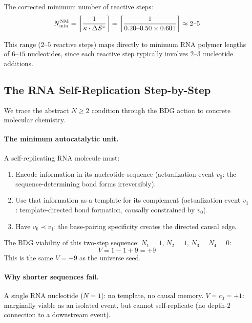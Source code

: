 \documentclass[12pt,a4paper]{article}
\begin{document}
The corrected minimum number of reactive steps:
\begin{equation}
  N_{\min}^{\rm NM} = \left\lceil\frac{1}{\kappa\cdot\Delta S^*}\right\rceil = \left\lceil\frac{1}{0.20\text{--}0.50\times0.601}\right\rceil \approx 2\text{--}5
  \label{eq:Nmin_NM}
\end{equation}

This range ($2$--$5$ reactive steps) maps directly to minimum RNA polymer lengths of $6$--$15$ nucleotides, since each reactive step typically involves $2$--$3$ nucleotide additions.

\subsection{The RNA Self-Replication Step-by-Step}

We trace the abstract $N\geq2$ condition through the BDG action to concrete molecular chemistry.

\paragraph{The minimum autocatalytic unit.}
A self-replicating RNA molecule must:
\begin{enumerate}
  \item Encode information in its nucleotide sequence (actualization event $v_0$: the sequence-determining bond forms irreversibly).
  \item Use that information as a template for its complement (actualization event $v_1$: template-directed bond formation, causally constrained by $v_0$).
  \item Have $v_0\prec v_1$: the base-pairing specificity creates the directed causal edge.
\end{enumerate}

The BDG viability of this two-step sequence: $N_1=1$, $N_2=1$, $N_3=N_4=0$:
\begin{equation}
  V = 1 - 1 + 9 = +9
\end{equation}
This is the same $V=+9$ as the universe seed.

\paragraph{Why shorter sequences fail.}
A single RNA nucleotide ($N=1$): no template, no causal memory.  $V=c_0=+1$: marginally viable as an isolated event, but cannot self-replicate (no depth-2 connection to a downstream event).
\end{document}
